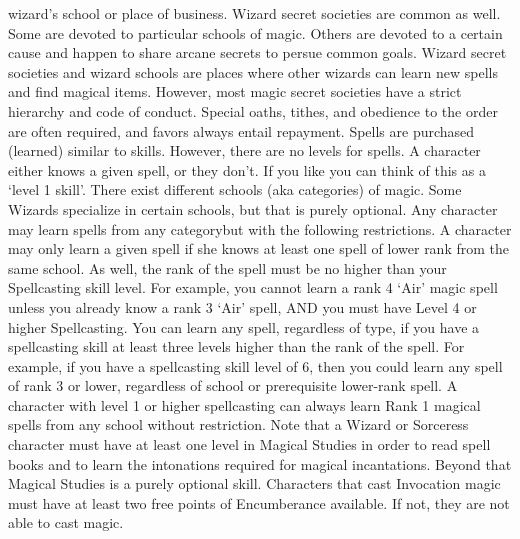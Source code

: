 \documentclass[twoside]{book}
\begin{document}
               wizard's school or place of business. Wizard secret
               societies are common as well. Some are devoted to
               particular schools of magic. Others are devoted to a
               certain cause and happen to share arcane secrets to persue
               common goals. Wizard secret societies and wizard schools
               are places where other wizards can learn new spells and
               find magical items. However, most magic secret societies
               have a strict hierarchy and code of conduct. Special
               oaths, tithes, and obedience to the order are often
               required, and favors always entail repayment.   Spells are purchased (learned) similar to skills.
               However, there are no levels for spells. A character
               either knows a given spell, or they don't. If you
               like you can think of this as a `level 1
               skill'.   There exist different schools (aka categories) of
               magic. Some Wizards specialize in certain schools, but
               that is purely optional. Any character may learn spells
               from any categorybut with the following
               restrictions. A character may only learn a given spell if
               she knows at least one spell of lower rank from the same
               school. As well, the rank of the spell must be no higher
               than your Spellcasting skill level. For example, you
               cannot learn a rank 4 `Air' magic spell unless
               you already know a rank 3 `Air' spell, AND you
               must have Level 4 or higher Spellcasting.   You can learn any spell, regardless of type, if you
               have a spellcasting skill at least three levels higher
               than the rank of the spell. For example, if you have a
               spellcasting skill level of 6, then you could learn any
               spell of rank 3 or lower, regardless of school or
               prerequisite lower-rank spell.   A character with level 1 or higher spellcasting can
               always learn Rank 1 magical spells from any school without
               restriction.   Note that a Wizard or Sorceress character must have
               at least one level in Magical Studies in order to read
               spell books and to learn the intonations required for
               magical incantations. Beyond that Magical Studies is a
               purely optional skill.   Characters that cast Invocation magic must have at
               least two free points of Encumberance available. If not,
               they are not able to cast magic. 
    
\end{document}
